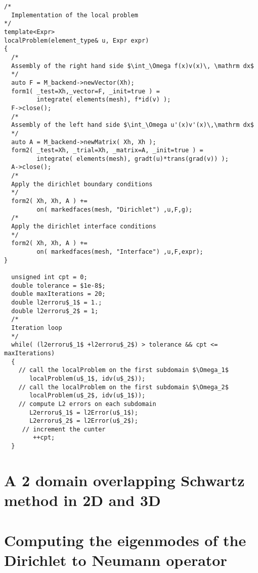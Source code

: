 \begin{lstlisting}
/*
  Implementation of the local problem
*/
template<Expr>
localProblem(element_type& u, Expr expr)
{
  /*
  Assembly of the right hand side $\int_\Omega f(x)v(x)\, \mathrm dx$
  */
  auto F = M_backend->newVector(Xh);
  form1( _test=Xh,_vector=F, _init=true ) =
         integrate( elements(mesh), f*id(v) );
  F->close();
  /*
  Assembly of the left hand side $\int_\Omega u'(x)v'(x)\,\mathrm dx$
  */
  auto A = M_backend->newMatrix( Xh, Xh );
  form2( _test=Xh, _trial=Xh, _matrix=A, _init=true ) =
         integrate( elements(mesh), gradt(u)*trans(grad(v)) );
  A->close();
  /*
  Apply the dirichlet boundary conditions
  */
  form2( Xh, Xh, A ) +=
         on( markedfaces(mesh, "Dirichlet") ,u,F,g);
  /*
  Apply the dirichlet interface conditions
  */
  form2( Xh, Xh, A ) +=
         on( markedfaces(mesh, "Interface") ,u,F,expr);
}

  unsigned int cpt = 0;
  double tolerance = $1e-8$;
  double maxIterations = 20;
  double l2erroru$_1$ = 1.;
  double l2erroru$_2$ = 1;
  /*
  Iteration loop
  */
  while( (l2erroru$_1$ +l2erroru$_2$) > tolerance && cpt <= maxIterations)
  {
    // call the localProblem on the first subdomain $\Omega_1$
       localProblem(u$_1$, idv(u$_2$));
    // call the localProblem on the first subdomain $\Omega_2$
       localProblem(u$_2$, idv(u$_1$));
    // compute L2 errors on each subdomain
       L2erroru$_1$ = l2Error(u$_1$);
       L2erroru$_2$ = l2Error(u$_2$);
     // increment the cunter
        ++cpt;
  }

\end{lstlisting}


\section{A 2 domain overlapping Schwartz method in 2D and 3D}
\label{sec:2-doma-overl}

\section{Computing the eigenmodes of the Dirichlet to Neumann operator}
\label{sec:comp-eigenm-dirichl}





